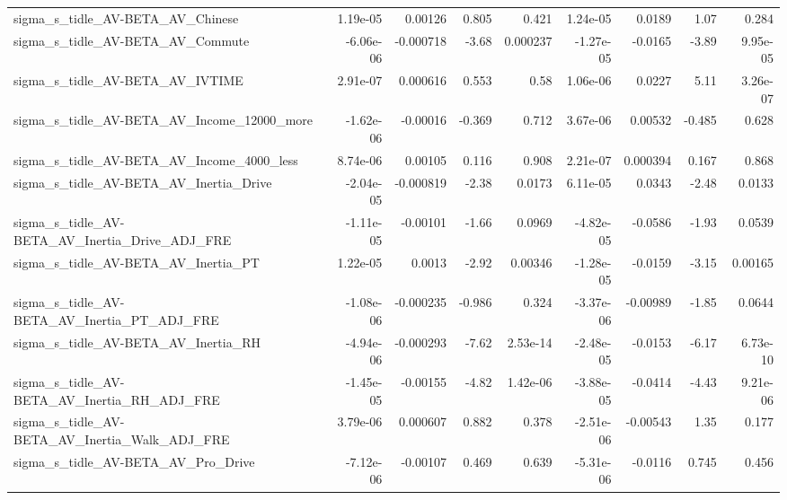 \begin{tabular}{lrrrrrrrr}
sigma\_s\_tidle\_AV-BETA\_AV\_Chinese                   &    1.19e-05 &      0.00126 &    0.805 &    0.421 &   1.24e-05 &      0.0189 &         1.07 &         0.284 \\
sigma\_s\_tidle\_AV-BETA\_AV\_Commute                   &   -6.06e-06 &    -0.000718 &    -3.68 & 0.000237 &  -1.27e-05 &     -0.0165 &        -3.89 &      9.95e-05 \\
sigma\_s\_tidle\_AV-BETA\_AV\_IVTIME                    &    2.91e-07 &     0.000616 &    0.553 &     0.58 &   1.06e-06 &      0.0227 &         5.11 &      3.26e-07 \\
sigma\_s\_tidle\_AV-BETA\_AV\_Income\_12000\_more         &   -1.62e-06 &     -0.00016 &   -0.369 &    0.712 &   3.67e-06 &     0.00532 &       -0.485 &         0.628 \\
sigma\_s\_tidle\_AV-BETA\_AV\_Income\_4000\_less          &    8.74e-06 &      0.00105 &    0.116 &    0.908 &   2.21e-07 &    0.000394 &        0.167 &         0.868 \\
sigma\_s\_tidle\_AV-BETA\_AV\_Inertia\_Drive             &   -2.04e-05 &    -0.000819 &    -2.38 &   0.0173 &   6.11e-05 &      0.0343 &        -2.48 &        0.0133 \\
sigma\_s\_tidle\_AV-BETA\_AV\_Inertia\_Drive\_ADJ\_FRE     &   -1.11e-05 &     -0.00101 &    -1.66 &   0.0969 &  -4.82e-05 &     -0.0586 &        -1.93 &        0.0539 \\
sigma\_s\_tidle\_AV-BETA\_AV\_Inertia\_PT                &    1.22e-05 &       0.0013 &    -2.92 &  0.00346 &  -1.28e-05 &     -0.0159 &        -3.15 &       0.00165 \\
sigma\_s\_tidle\_AV-BETA\_AV\_Inertia\_PT\_ADJ\_FRE        &   -1.08e-06 &    -0.000235 &   -0.986 &    0.324 &  -3.37e-06 &    -0.00989 &        -1.85 &        0.0644 \\
sigma\_s\_tidle\_AV-BETA\_AV\_Inertia\_RH                &   -4.94e-06 &    -0.000293 &    -7.62 & 2.53e-14 &  -2.48e-05 &     -0.0153 &        -6.17 &      6.73e-10 \\
sigma\_s\_tidle\_AV-BETA\_AV\_Inertia\_RH\_ADJ\_FRE        &   -1.45e-05 &     -0.00155 &    -4.82 & 1.42e-06 &  -3.88e-05 &     -0.0414 &        -4.43 &      9.21e-06 \\
sigma\_s\_tidle\_AV-BETA\_AV\_Inertia\_Walk\_ADJ\_FRE      &    3.79e-06 &     0.000607 &    0.882 &    0.378 &  -2.51e-06 &    -0.00543 &         1.35 &         0.177 \\
sigma\_s\_tidle\_AV-BETA\_AV\_Pro\_Drive                 &   -7.12e-06 &     -0.00107 &    0.469 &    0.639 &  -5.31e-06 &     -0.0116 &        0.745 &         0.456 \\

\end{tabular}
